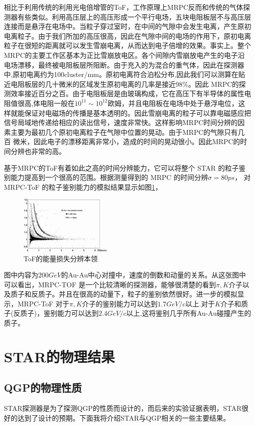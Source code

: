 \documentclass[%
 reprint,
 amsmath,amssymb,
 aps,
]{revtex4-1}
\begin{document}
相比于利用传统的利用光电倍增管的ToF，工作原理上MRPC反而和传统的气体探测器有些类似。利用高压层上的高压形成一个平行电场，五块电阻板层不与高压层连接而是悬浮在电场中。当粒子穿过室时，在中间的气隙中会发生电离，产生原初电离粒子。由于我们所加的高压很高，因此在气隙中间的电场的作用下，原初电离粒子在很短的距离就可以发生雪崩电离，从而达到电子倍增的效果。事实上。整个MRPC的主要工作区基本为正比雪崩放电区。各个间隙内雪崩放电产生的电子沿电场漂移，最终被电阻板层所阻断。由于充入的为混合的重气体，因此在探测器中,原初电离约为100cluster/mm。原初电离符合泊松分布,因此我们可以测算在贴近电阻板层的几十微米的区域发生原初电离的几率是接近98\%。因此 MRPC的探测效率接近百分之百。由于电阻板层是由玻璃构成，它在高压下有半导体的属性电阻值很高,体电阻一般在$10^{11}\sim10^{12}$欧姆，并且电阻板在电场中处于悬浮电位，这样就能保证对电磁场的传播是基本透明的。因此雪崩电离的粒子可以靠电磁感应把信号局域地传递给相应的读出信号，速度非常快。这样影响MRPC时间分辨的因素主要为最初几个原初电离粒子在气隙中位置的晃动。由于MRPC的气隙只有几百 微米，因此电子的漂移距离非常小，造成的时间的晃动很小。因此MRPC的时间分辨也非常的高。

基于MRPC的ToF有着如此之高的时间分辨能力，它可以将整个 STAR 的粒子鉴别能力提高到一个很高的范围。根据测量得到的 MRPC 的时间分辨$\sigma=80\si{ps}$， 对 MRPC-ToF 的粒子鉴别能力的模拟结果显示如图\ref{fig:ToF}，
\begin{figure}[htbp]
    \includegraphics[width = 0.4\textwidth]{Plots/dEdxToF.png}
    \caption{\label{fig:ToF}ToF的能量损失分辨本领}
\end{figure}
图中内容为$200\si{GeV}$的Au-Au中心对撞中，速度的倒数和动量的关系。从这张图中可以看出，MRPC-TOF 是一个比较清晰的探测器，能够很清楚的看到$\pi,K$介子以及质子和反质子。并且在很高的动量下，粒子的鉴别依然很好。进一步的模拟显示，MRPC-ToF 对于$\pi,K$介子的鉴别能力可以达到$1.7\si{GeV/c}$以上.对于$K$介子和质子(反质子)，鉴别能力可以达到$2.4\si{GeV/c}$以上,这将鉴别几乎所有Au-Au碰撞产生的质子。

\section{\label{sec:PhyRes}STAR的物理结果}
\subsection{\label{sec:qgp}QGP的物理性质}
STAR探测器是为了探测QGP的性质而设计的，而后来的实验证据表明，STAR很好的达到了设计的预期。下面我将介绍STAR与QGP相关的一些主要结果。
\end{document}
